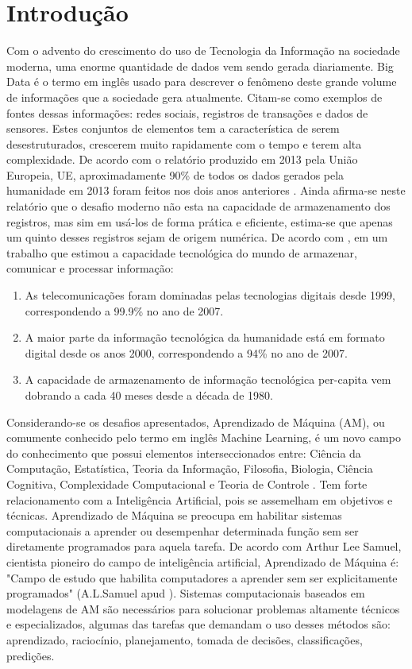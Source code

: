 \chapter{Introdução}


Com o advento do crescimento do uso de Tecnologia da Informação na sociedade moderna, uma enorme quantidade de dados vem sendo gerada diariamente. Big Data é o termo em inglês usado para descrever o fenômeno deste grande volume de informações que a sociedade gera atualmente. Citam-se como exemplos de fontes dessas informações: redes sociais, registros de transações e dados de sensores. Estes conjuntos de elementos tem a característica de serem desestruturados, crescerem muito rapidamente com o tempo e terem alta complexidade. De acordo com o relatório produzido em 2013 pela União Europeia, UE, aproximadamente 90\% de todos os dados gerados pela humanidade em 2013 foram feitos nos dois anos anteriores \cite{eu2013}. Ainda afirma-se neste relatório que o desafio moderno não esta na capacidade de armazenamento dos registros, mas sim em usá-los de forma prática e eficiente, estima-se que apenas um quinto desses registros sejam de origem numérica. De acordo com , em um trabalho que estimou a capacidade tecnológica do mundo de armazenar, comunicar e processar informação: 

\begin{enumerate}
\item As telecomunicações foram dominadas pelas tecnologias digitais desde 1999, correspondendo a 99.9\% no ano de 2007. 
\item A maior parte da informação tecnológica da humanidade está em formato digital desde os anos 2000, correspondendo a 94\% no ano de 2007.
\item A capacidade de armazenamento de informação tecnológica per-capita vem dobrando a cada 40 meses desde a década de 1980.
\end{enumerate}
   

Considerando-se os desafios apresentados, Aprendizado de Máquina (AM), ou comumente conhecido pelo termo em inglês Machine Learning, é um novo campo do conhecimento que possui elementos  interseccionados entre: Ciência da Computação, Estatística, Teoria da Informação, Filosofia, Biologia, Ciência Cognitiva, Complexidade Computacional e Teoria de Controle \cite{mitch1997}. Tem forte relacionamento  com a Inteligência Artificial, pois se assemelham em objetivos e técnicas. Aprendizado de Máquina se preocupa em habilitar sistemas computacionais a aprender ou desempenhar determinada função sem ser diretamente programados para aquela tarefa. De acordo com Arthur Lee Samuel, cientista pioneiro do campo de inteligência artificial, Aprendizado de Máquina é: "Campo de estudo que habilita computadores a aprender sem ser explicitamente programados" (A.L.Samuel apud ). Sistemas computacionais baseados em modelagens de AM são necessários para solucionar problemas altamente técnicos e especializados, algumas das tarefas que demandam o uso desses métodos são: aprendizado, raciocínio, planejamento, tomada de decisões, classificações, predições. 

